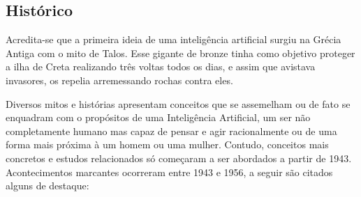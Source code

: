 \documentclass[a4paper,12pt]{article}
\begin{document}
\subsection{Histórico}

Acredita-se que a primeira ideia de uma inteligência artificial surgiu na Grécia Antiga com o mito de Talos. Esse gigante de bronze tinha como objetivo proteger  a ilha de Creta realizando três voltas todos os dias, e assim que avistava invasores, os repelia arremessando rochas contra eles.

Diversos mitos e histórias apresentam conceitos que se assemelham ou de fato se enquadram com o propósitos de uma Inteligência Artificial, um ser não completamente humano mas capaz de pensar e agir racionalmente ou de uma forma mais próxima à um homem ou uma mulher. Contudo, conceitos mais concretos e estudos relacionados só começaram a ser abordados a partir de 1943. Acontecimentos marcantes ocorreram entre 1943 e 1956, a seguir são citados alguns de destaque:
\end{document}
